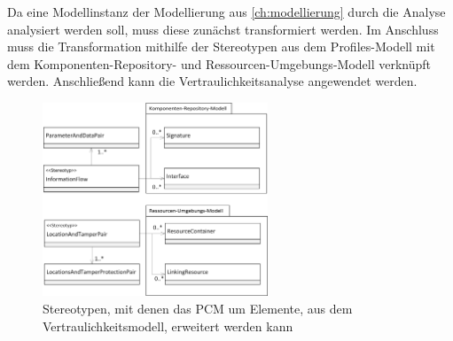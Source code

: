 Da eine Modellinstanz der Modellierung aus \autoref{ch:modellierung} durch die Analyse analysiert werden soll, muss diese zunächst transformiert werden. Im Anschluss muss die Transformation mithilfe der Stereotypen aus dem Profiles-Modell mit dem Komponenten-Repository- und Ressourcen-Umgebungs-Modell verknüpft werden. Anschließend kann die Vertraulichkeitsanalyse angewendet werden.
\begin{figure}[h]
	\centering
  	\includegraphics[width=0.6\textwidth]{images/profiles.png}
	\caption{Stereotypen, mit denen das PCM um Elemente, aus dem Vertraulichkeitsmodell, erweitert werden kann}
	\label{img:profiles}
\end{figure}

